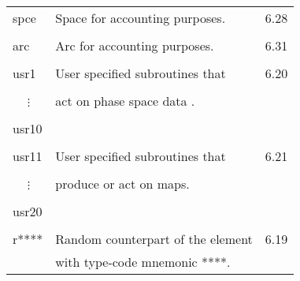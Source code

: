 \begin{center}
\begin{tabular}{lll}
\hspace{1.5em}spce    &         Space for accounting purposes.      & \hspace{2em}6.28\\
\vspace{-3mm}& &\\
\hspace{1.5em}arc  &  Arc for accounting purposes.  &   \hspace{2em}6.31\\
\vspace{-3mm}& &\\
\hspace{1.5em}usr1    &         User specified subroutines that     &  \hspace{2em}6.20\\
\vspace{-7mm}& &\\
\hspace{1.5em}\ \ \,$\vdots$ &         act on phase space data .            &      \\
\vspace{-7mm}& &\\
\hspace{1.5em}usr10    &                                             &      \\
\vspace{-3mm}& &\\
\hspace{1.5em}usr11    &         User specified subroutines that     &  \hspace{2em}6.21\\
\vspace{-7mm}& &\\
\hspace{1.5em}\ \ \,$\vdots$ &         produce or act on maps.              &      \\
\vspace{-7mm}& &\\
\hspace{1.5em}usr20    &                                             &      \\
\vspace{-3mm}& &\\
\hspace{1.5em}r****   &         Random counterpart of the element   &  \hspace{2em}6.19\\
                      &         with type-code mnemonic ****.        &
\end{tabular}
\end{center}


